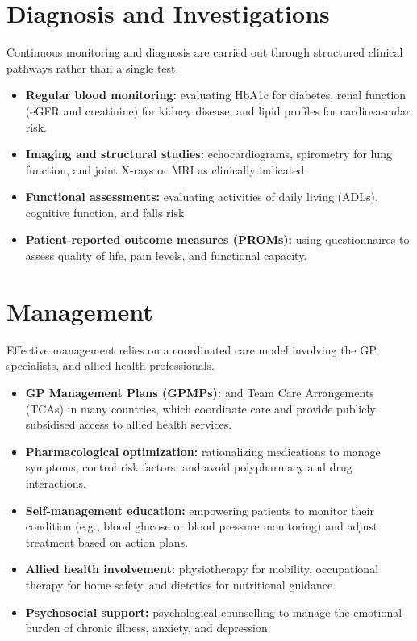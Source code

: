 \section*{Diagnosis and Investigations}
Continuous monitoring and diagnosis are carried out through structured clinical pathways rather than a single test.
\begin{itemize}
    \item \textbf{Regular blood monitoring:} evaluating HbA1c for diabetes, renal function (eGFR and creatinine) for kidney disease, and lipid profiles for cardiovascular risk.
    \item \textbf{Imaging and structural studies:} echocardiograms, spirometry for lung function, and joint X-rays or MRI as clinically indicated.
    \item \textbf{Functional assessments:} evaluating activities of daily living (ADLs), cognitive function, and falls risk.
    \item \textbf{Patient-reported outcome measures (PROMs):} using questionnaires to assess quality of life, pain levels, and functional capacity.
\end{itemize}

\section*{Management}
Effective management relies on a coordinated care model involving the GP, specialists, and allied health professionals.
\begin{itemize}
    \item \textbf{GP Management Plans (GPMPs):} and Team Care Arrangements (TCAs) in many countries, which coordinate care and provide publicly subsidised access to allied health services.
    \item \textbf{Pharmacological optimization:} rationalizing medications to manage symptoms, control risk factors, and avoid polypharmacy and drug interactions.
    \item \textbf{Self-management education:} empowering patients to monitor their condition (e.g., blood glucose or blood pressure monitoring) and adjust treatment based on action plans.
    \item \textbf{Allied health involvement:} physiotherapy for mobility, occupational therapy for home safety, and dietetics for nutritional guidance.
    \item \textbf{Psychosocial support:} psychological counselling to manage the emotional burden of chronic illness, anxiety, and depression.
\end{itemize}

